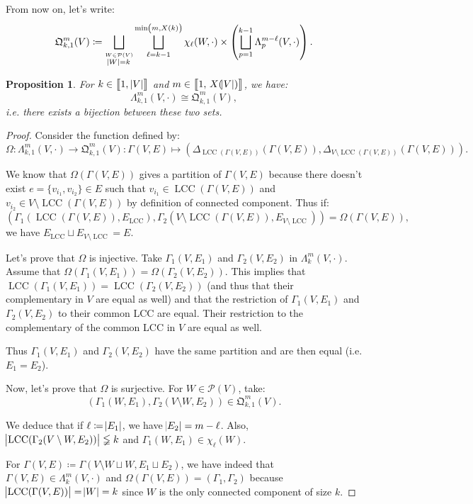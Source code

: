\documentclass{article}
\newtheorem{proposition}[lemma]{Proposition}
\theoremstyle{definition}
\theoremstyle{remark}
\DeclareMathOperator{\LCC}{LCC}
\newcommand{\intint}[2]{\left\llbracket#1, \, #2\right\rrbracket}
\begin{document}
		From now on, let's write:
		\[\mathfrak Q_{k,1}^m(V) \coloneqq \bigsqcup_{\stackrel {W \in \mathcal P(V)}{\abs W = k}}\bigsqcup_{\ell=k-1}^{\min\left(m, X(k)\right)}
			\chi_\ell(W, \cdot) \times \left(\bigsqcup_{p=1}^{k-1}\Lambda_p^{m-\ell}(V, \cdot)\right).\]

		\begin{proposition}\label{prp:Lambda_k,alpha^m(V, cdot) cong mathfrak Q_k,alpha^m(V)} For $k \in \intint 1{\abs V}$ and $m \in \intint 1{X(\abs V)}$, we have:
		\[\Lambda_{k,1}^m(V, \cdot) \cong \mathfrak Q_{k,1}^m(V),\]
		i.e. there exists a bijection between these two sets.
		\end{proposition}

		\begin{proof} Consider the function defined by:
		\[\Omega : \Lambda_{k,1}^m(V, \cdot) \to \mathfrak Q_{k,1}^m(V) :
			\Gamma(V, E) \mapsto \left(\Delta_{\LCC(\Gamma(V, E))}(\Gamma(V, E)), \Delta_{V \setminus \LCC(\Gamma(V, E))}(\Gamma(V, E))\right).\]

		We know that $\Omega(\Gamma(V, E))$ gives a partition of $\Gamma(V, E)$ because there doesn't exist $e = \{v_{i_1}, v_{i_2}\} \in E$ such that
		$v_{i_1} \in \LCC(\Gamma(V, E))$ and $v_{i_2} \in V \setminus \LCC(\Gamma(V, E))$ by definition of connected component. Thus if:
		\[\left(\Gamma_1(\LCC(\Gamma(V, E)), E_{\LCC}), \Gamma_2(V \setminus \LCC(\Gamma(V, E)), E_{V \setminus \LCC})\right) = \Omega(\Gamma(V, E)),\]
		we have $E_{\LCC} \sqcup E_{V \setminus \LCC} = E$.

		Let's prove that $\Omega$ is injective. Take $\Gamma_1(V, E_1)$ and $\Gamma_2(V, E_2)$ in $\Lambda_k^m(V, \cdot)$. Assume that
		$\Omega(\Gamma_1(V, E_1)) = \Omega(\Gamma_2(V, E_2))$. This implies that $\LCC(\Gamma_1(V, E_1)) = \LCC(\Gamma_2(V, E_2))$ (and thus that their complementary
		in $V$ are equal as well) and that the restriction of $\Gamma_1(V, E_1)$ and $\Gamma_2(V, E_2)$ to their common LCC are equal. Their restriction to the
		complementary of the common LCC in $V$ are equal as well.

		Thus $\Gamma_1(V, E_1)$ and $\Gamma_2(V, E_2)$ have the same partition and are then equal (i.e. $E_1=E_2$).

		Now, let's prove that $\Omega$ is surjective. For $W \in \mathcal P(V)$, take:
		\[\left(\Gamma_1(W, E_1), \Gamma_2(V \setminus W, E_2)\right) \in \mathfrak Q_{k,1}^m(V).\]

		We deduce that if $\ell \coloneqq \abs {E_1}$, we have $\abs {E_2} = m-\ell$. Also, $\abs {\LCC(\Gamma_2(V \setminus W, E_2))} \lneqq k$ and
		$\Gamma_1(W, E_1) \in \chi_\ell(W)$.

		For $\Gamma(V, E) \coloneqq \Gamma(V \setminus W \sqcup W, E_1 \sqcup E_2)$, we have indeed that $\Gamma(V, E) \in \Lambda_k^m(V, \cdot)$ and
		$\Omega(\Gamma(V, E)) = \left(\Gamma_1, \Gamma_2\right)$ because $\abs {\LCC(\Gamma(V, E))} = \abs {W} = k$ since $W$ is the only connected
		component of size $k$.
		\end{proof}
\end{document}
